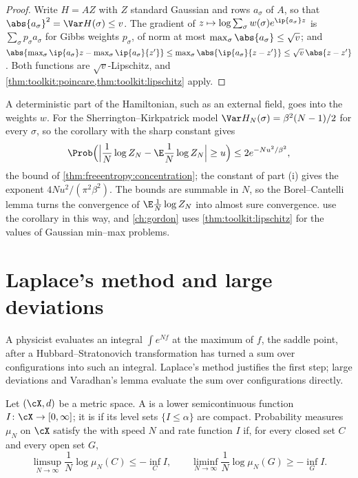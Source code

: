 \begin{refsection}
\begin{proof}
Write $H=AZ$ with $Z$ standard Gaussian and rows $a_\sigma$ of $A$, so that $\abs{a_\sigma}^2=\Var H(\sigma)\le v$. The gradient of $z\mapsto\log\sum_\sigma w(\sigma)e^{\ip{a_\sigma}z}$ is $\sum_\sigma p_\sigma a_\sigma$ for Gibbs weights $p_\sigma$, of norm at most $\max_\sigma\abs{a_\sigma}\le\sqrt v$; and $\abs{\max_\sigma\ip{a_\sigma}z-\max_\sigma\ip{a_\sigma}{z'}}\le\max_\sigma\abs{\ip{a_\sigma}{z-z'}}\le\sqrt v\,\abs{z-z'}$. Both functions are $\sqrt v$-Lipschitz, and \cref{thm:toolkit:poincare,thm:toolkit:lipschitz} apply.
\end{proof}

A deterministic part of the Hamiltonian, such as an external field, goes into the weights $w$. For the Sherrington--Kirkpatrick model $\Var H_N(\sigma)=\beta^2(N-1)/2$ for every $\sigma$, so the corollary with the sharp constant gives
\[
\Prob\Bigl(\Bigl\lvert\frac1N\log Z_N-\E\frac1N\log Z_N\Bigr\rvert\ge u\Bigr)\le2e^{-Nu^2/\beta^2},
\]
the bound of \cref{thm:freeentropy:concentration}; the constant of part (i) gives the exponent $4Nu^2/(\pi^2\beta^2)$. The bounds are summable in $N$, so the Borel--Cantelli lemma turns the convergence of $\E\frac1N\log Z_N$ into almost sure convergence.  use the corollary in this way, and \cref{ch:gordon} uses \cref{thm:toolkit:lipschitz} for the values of Gaussian min--max problems.

\section{Laplace's method and large deviations}\label{sec:toolkit:laplace}

A physicist evaluates an integral $\int e^{Nf}$ at the maximum of $f$, the saddle point, after a Hubbard--Stratonovich transformation has turned a sum over configurations into such an integral. Laplace's method justifies the first step; large deviations and Varadhan's lemma evaluate the sum over configurations directly.

\begin{definition}\label{def:toolkit:ldp}
Let $(\cX,d)$ be a metric space. A  is a lower semicontinuous function $I\colon\cX\to[0,\infty]$; it is  if its level sets $\{I\le\alpha\}$ are compact. Probability measures $\mu_N$ on $\cX$ satisfy the  with speed $N$ and rate function $I$ if, for every closed set $C$ and every open set $G$,
\[
\limsup_{N\to\infty}\frac1N\log\mu_N(C)\le-\inf_CI,\qquad\liminf_{N\to\infty}\frac1N\log\mu_N(G)\ge-\inf_GI.
\]
\end{definition}


\end{refsection}
